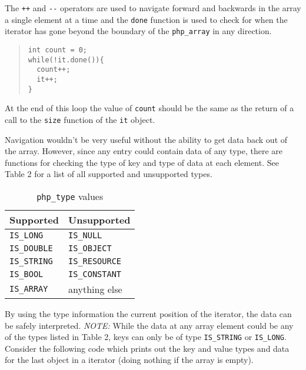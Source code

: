 \documentclass[11pt,titlepage]{article}
\begin{document}
The \verb|++| and \verb|--| operators are used to navigate forward and backwards in the array a single element at a time and the \verb|done| function is used to check for when the iterator has gone beyond the boundary of the \verb|php_array| in any direction.

\begin{quote}
\begin{verbatim}
int count = 0;
while(!it.done()){
  count++;
  it++;
}
\end{verbatim}
\end{quote}

At the end of this loop the value of \verb|count| should be the same as the return of a call to the \verb|size| function of the \verb|it| object. 

Navigation wouldn't be very useful without the ability to get data back out of the array. However, since any entry could contain data of any type, there are functions for checking the type of key and type of data at each element. See Table 2 for a list of all supported and unsupported types.

\begin{table}[!h]
\label{Table2}
\caption{\texttt{php\_type} values}
\begin{center}
\begin{tabular}{l l}
Supported & Unsupported\\
\hline
\verb|IS_LONG| & \verb|IS_NULL|\\
\verb|IS_DOUBLE| & \verb|IS_OBJECT|\\
\verb|IS_STRING| & \verb|IS_RESOURCE|\\
\verb|IS_BOOL| & \verb|IS_CONSTANT|\\
\verb|IS_ARRAY| & anything else\\
\end{tabular}
\end{center}
\end{table}

By using the type information the current position of the iterator, the data can be safely interpreted. \emph{NOTE:} While the data at any array element could be any of the types listed in Table 2, keys can only be of type \verb|IS_STRING| or \verb|IS_LONG|. Consider the following code which prints out the key and value types and data for the last object in a iterator (doing nothing if the array is empty).
\end{document}
